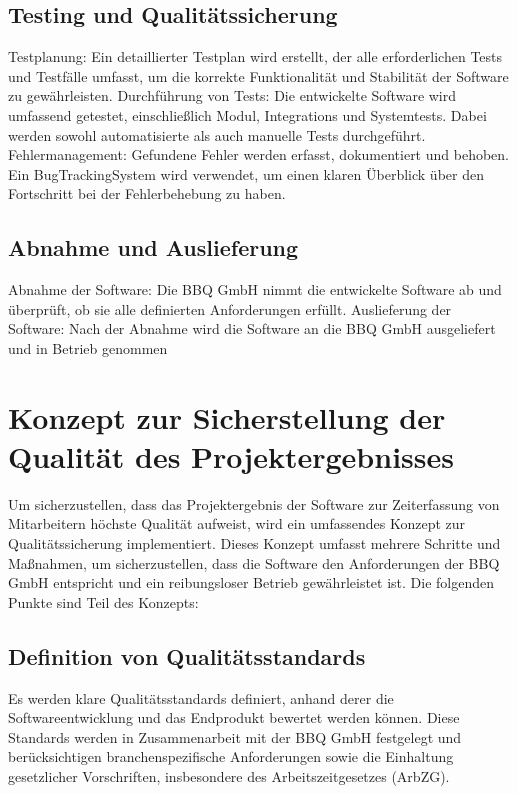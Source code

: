 \documentclass[12pt]{article}
\begin{document}
	\subsection{Testing und Qualitätssicherung}
	Testplanung: Ein detaillierter Testplan wird erstellt, der alle erforderlichen Tests und Testfälle umfasst, um die korrekte Funktionalität und Stabilität der Software zu gewährleisten.
	Durchführung von Tests: Die entwickelte Software wird umfassend getestet, einschließlich Modul, Integrations und Systemtests. Dabei werden sowohl automatisierte als auch manuelle Tests durchgeführt.
	Fehlermanagement: Gefundene Fehler werden erfasst, dokumentiert und behoben. Ein BugTrackingSystem wird verwendet, um einen klaren Überblick über den Fortschritt bei der Fehlerbehebung zu haben.

	\subsection{Abnahme und Auslieferung}
	Abnahme der Software: Die BBQ GmbH nimmt die entwickelte Software ab und überprüft, ob sie alle definierten Anforderungen erfüllt.
	Auslieferung der Software: Nach der Abnahme wird die Software an die BBQ GmbH ausgeliefert und in Betrieb genommen

	\section{Konzept zur Sicherstellung der Qualität des Projektergebnisses}
	Um sicherzustellen, dass das Projektergebnis der Software zur Zeiterfassung von Mitarbeitern höchste Qualität aufweist, wird ein umfassendes Konzept zur Qualitätssicherung implementiert. Dieses Konzept umfasst mehrere Schritte und Maßnahmen, um sicherzustellen, dass die Software den Anforderungen der BBQ GmbH entspricht und ein reibungsloser Betrieb gewährleistet ist. Die folgenden Punkte sind Teil des Konzepts:
	
	\subsection{Definition von Qualitätsstandards}
	 Es werden klare Qualitätsstandards definiert, anhand derer die Softwareentwicklung und das Endprodukt bewertet werden können. Diese Standards werden in Zusammenarbeit mit der BBQ GmbH festgelegt und berücksichtigen branchenspezifische Anforderungen sowie die Einhaltung gesetzlicher Vorschriften, insbesondere des Arbeitszeitgesetzes (ArbZG).
	
\end{document}
